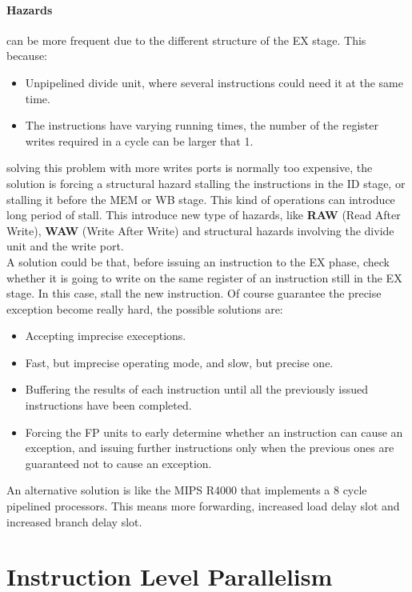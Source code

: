 \documentclass[12pt]{article}
\begin{document}
\paragraph{Hazards} can be more frequent due to the different structure of the EX stage. This because:
\begin{itemize}
  \item Unpipelined divide unit, where several instructions could need it at the same time.
  \item The instructions have varying running times, the number of the register writes required in a cycle can be larger that 1.
\end{itemize}
solving this problem with more writes ports is normally too expensive, the solution is forcing a structural hazard stalling the instructions in the ID stage, or stalling it before the MEM or WB stage. This kind of operations can introduce long period of stall. This introduce new type of hazards, like \textbf{RAW} (Read After Write), \textbf{WAW} (Write After Write) and  structural hazards involving the divide unit and the write port.\\
A solution could be that, before issuing an instruction to the EX phase, check whether it is going to write on the same register of an instruction still in the EX stage. In this case, stall the new instruction. Of course guarantee the precise exception become really hard, the possible solutions are:
\begin{itemize}
  \item Accepting imprecise execeptions.
  \item Fast, but imprecise operating mode, and slow, but precise one.
  \item Buffering the results of each instruction until all the previously issued instructions have been completed.
  \item Forcing the FP units to early determine whether an instruction can cause an exception, and issuing further instructions only when the previous ones are guaranteed not to cause an exception.
\end{itemize}
An alternative solution is like the MIPS R4000 that implements a 8 cycle pipelined processors. This means more forwarding, increased load delay slot and increased branch delay slot.

\section{Instruction Level Parallelism}




\end{document}
